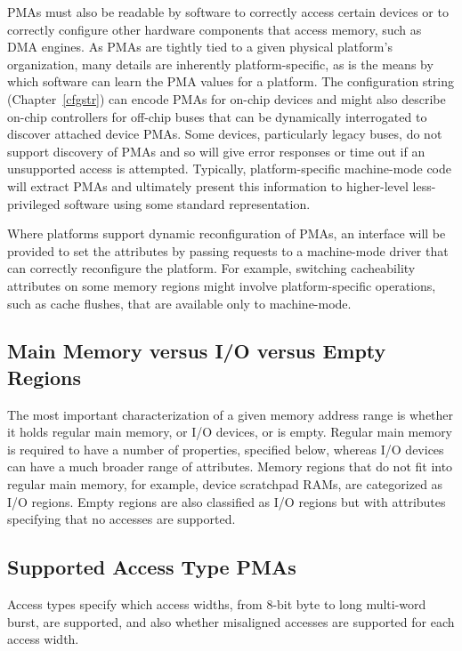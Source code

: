 PMAs must also be readable by software to correctly access certain
devices or to correctly configure other hardware components that
access memory, such as DMA engines.  As PMAs are tightly tied to a
given physical platform's organization, many details are inherently
platform-specific, as is the means by which software can learn the PMA
values for a platform.  The configuration string
(Chapter~\ref{cfgstr}) can encode PMAs for on-chip devices and might
also describe on-chip controllers for off-chip buses that can be
dynamically interrogated to discover attached device PMAs.  Some
devices, particularly legacy buses, do not support discovery of PMAs
and so will give error responses or time out if an unsupported access
is attempted.  Typically, platform-specific machine-mode code will
extract PMAs and ultimately present this information to higher-level
less-privileged software using some standard representation.

Where platforms support dynamic reconfiguration of PMAs, an interface
will be provided to set the attributes by passing requests to a
machine-mode driver that can correctly reconfigure the platform.  For
example, switching cacheability attributes on some memory regions
might involve platform-specific operations, such as cache flushes,
that are available only to machine-mode.

\subsection{Main Memory versus I/O versus Empty Regions}

The most important characterization of a given memory address range is
whether it holds regular main memory, or I/O devices, or is empty.
Regular main memory is required to have a number of properties,
specified below, whereas I/O devices can have a much broader range of
attributes.  Memory regions that do not fit into regular main
memory, for example, device scratchpad RAMs, are categorized as I/O
regions.  Empty regions are also classified as I/O regions but with
attributes specifying that no accesses are supported.

\subsection{Supported Access Type PMAs}

Access types specify which access widths, from 8-bit byte to long
multi-word burst, are supported, and also whether misaligned accesses
are supported for each access width.

